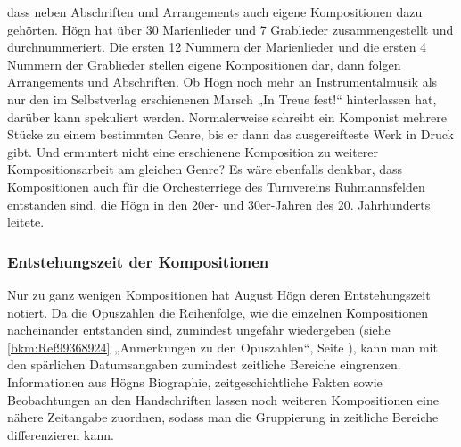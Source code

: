 \documentclass[a4paper]{article}
\begin{document}
dass neben Abschriften und Arrangements auch eigene Kompositionen dazu
gehörten. Högn hat über 30 Marienlieder und 7 Grablieder
zusammengestellt und durchnummeriert. Die ersten 12 Nummern der
Marienlieder und die ersten 4 Nummern der Grablieder stellen eigene
Kompositionen dar, dann folgen Arrangements und Abschriften. Ob Högn
noch mehr an Instrumentalmusik als nur den im Selbstverlag erschienenen
Marsch „In Treue fest!“ hinterlassen hat, darüber kann spekuliert
werden. Normalerweise schreibt ein Komponist mehrere Stücke zu einem
bestimmten Genre, bis er dann das ausgereifteste Werk in Druck gibt.
Und ermuntert nicht eine erschienene Komposition zu weiterer
Kompositionsarbeit am gleichen Genre? Es wäre ebenfalls denkbar, dass
Kompositionen auch für die Orchesterriege des Turnvereins
Ruhmannsfelden entstanden sind, die Högn in den 20er- und 30er-Jahren
des 20. Jahrhunderts leitete.

\subsubsection{Entstehungszeit der Kompositionen}
\label{bkm:Ref98427747}\hypertarget{RefHeadingToc100333742}{}Nur zu ganz
wenigen Kompositionen hat August Högn deren Entstehungszeit notiert. Da
die Opuszahlen die Reihenfolge, wie die einzelnen Kompositionen
nacheinander entstanden sind, zumindest ungefähr wiedergeben (siehe
\ref{bkm:Ref99368924} „Anmerkungen zu den Opuszahlen“, Seite
\pageref{bkm:Ref98509933}), kann man mit den spärlichen Datumsangaben
zumindest zeitliche Bereiche eingrenzen. Informationen aus Högns
Biographie, zeitgeschichtliche Fakten sowie Beobachtungen an den
Handschriften lassen noch weiteren Kompositionen eine nähere Zeitangabe
zuordnen, sodass man die Gruppierung in zeitliche Bereiche
differenzieren kann.
\end{document}

